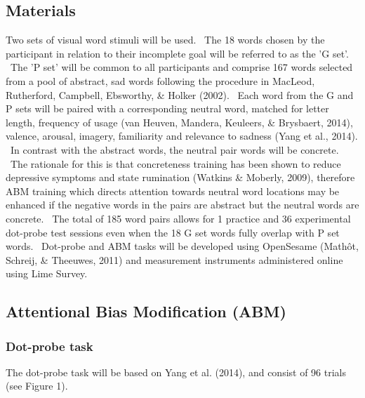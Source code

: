 \documentclass[man,a4paper]{apa6}
\newcounter{Figure}
\begin{document}
\subsection{Materials}
Two sets of visual word stimuli will be used. \ The 18 words chosen by the participant in relation to their incomplete goal will be referred to as the 'G set'. \ The 'P set' will be common to all participants and comprise 167 words selected from a pool of abstract, sad words following the procedure in MacLeod, Rutherford, Campbell, Ebsworthy, \& Holker (2002). \ Each word from the G and P sets will be paired with a corresponding neutral word, matched for letter length, frequency of usage (van Heuven, Mandera, Keuleers, \& Brysbaert, 2014), valence, arousal, imagery, familiarity and relevance to sadness (Yang et al., 2014). \ In contrast with the abstract words, the neutral pair words will be concrete. \ The rationale for this is that concreteness training has been shown to reduce depressive symptoms and state rumination (Watkins \& Moberly, 2009), therefore ABM training which directs attention towards neutral word locations may be enhanced if the negative words in the pairs are abstract but the neutral words are concrete. \ The total of 185 word pairs allows for 1 practice and 36 experimental dot-probe test sessions even when the 18 G set words fully overlap with P set words. \ Dot-probe and ABM tasks will be developed using OpenSesame (Math\^ot, Schreij, \& Theeuwes, 2011) and measurement instruments administered online using Lime Survey.

\subsection{Attentional Bias Modification (ABM)}
\subsubsection{Dot-probe task}
The dot-probe task will be based on Yang et al. (2014), and consist of 96 trials (see Figure 1).
\end{document}
